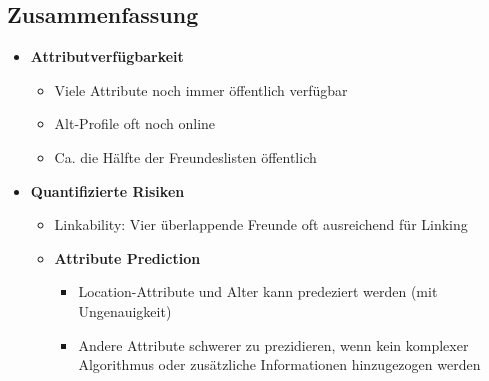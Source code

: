 \subsection{Zusammenfassung}
\begin{itemize}
	\item \textbf{Attributverfügbarkeit}
	\begin{itemize}
		\item Viele Attribute noch immer öffentlich verfügbar
		\item Alt-Profile oft noch online
		\item Ca. die Hälfte der Freundeslisten öffentlich
	\end{itemize}
	\item \textbf{Quantifizierte Risiken}
	\begin{itemize}
		\item Linkability: Vier überlappende Freunde oft ausreichend für Linking
		\item \textbf{Attribute Prediction}
		\begin{itemize}
			\item Location-Attribute und Alter kann predeziert werden (mit Ungenauigkeit)
			\item Andere Attribute schwerer zu prezidieren, wenn kein komplexer Algorithmus oder zusätzliche Informationen hinzugezogen werden
		\end{itemize}
	\end{itemize}
\end{itemize}
